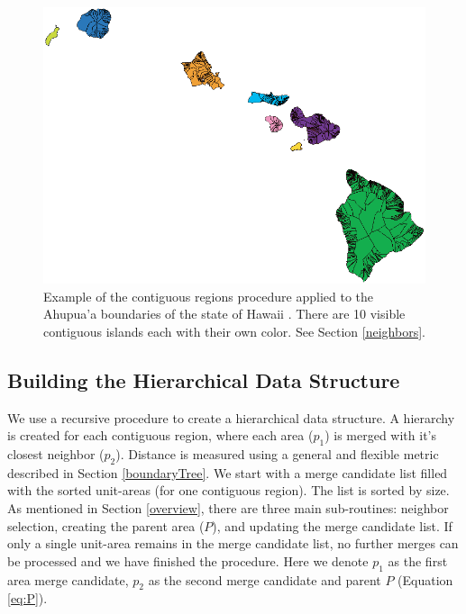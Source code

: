 \begin{figure}
\centering
\includegraphics[width=.5\linewidth]{images/ahupuaa} 
\caption{Example of the contiguous regions procedure applied to the Ahupua'a boundaries of the state of Hawaii \cite{hawaii}. There are 10 visible contiguous islands each with their own color. See Section \ref{neighbors}.
} \label{fig:contiguous} \vspace{-0.2cm}
\end{figure}


\subsection{Building the Hierarchical Data Structure}
We use a recursive procedure to create a hierarchical data structure. A hierarchy is created for each contiguous region, where each area ($p_1$) is merged with it's closest neighbor ($p_2$). Distance is measured using a general and flexible metric described in Section \ref{boundaryTree}. We start with a merge candidate list filled with the sorted unit-areas (for one contiguous region). The list is sorted by size. As mentioned in Section \ref{overview}, there are three main sub-routines: neighbor selection, creating the parent area ($P$), and updating the merge candidate list. If only a single unit-area remains in the merge candidate list, no further merges can be processed and we have finished the procedure. Here we denote $p_1$ as the first area merge candidate, $p_2$ as the second merge candidate and parent $P$ (Equation \ref{eq:P}).

